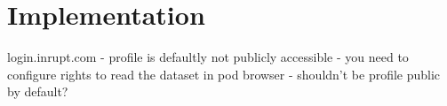 \chapter{Implementation}
login.inrupt.com - profile is defaultly not publicly accessible - you need to configure rights to read the dataset in pod browser - shouldn't be profile public by default?